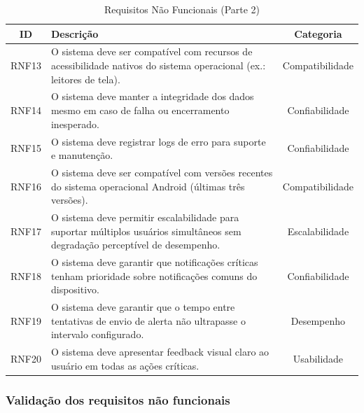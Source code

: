 \begin{table}[H]
\caption{Requisitos Não Funcionais (Parte 2)}
\label{quad_rnf2}
\centering

\begin{tabular}{|c|p{8cm}|c|}
\hline
\textbf{ID} & \textbf{Descrição} & \textbf{Categoria} \\
\hline

RNF13 &
O sistema deve ser compatível com recursos de acessibilidade nativos do sistema operacional (ex.: leitores de tela). &
Compatibilidade \\
\hline

RNF14 &
O sistema deve manter a integridade dos dados mesmo em caso de falha ou encerramento inesperado. &
Confiabilidade \\
\hline

RNF15 &
O sistema deve registrar logs de erro para suporte e manutenção. &
Confiabilidade \\
\hline

RNF16 &
O sistema deve ser compatível com versões recentes do sistema operacional Android (últimas três versões). &
Compatibilidade \\
\hline

RNF17 &
O sistema deve permitir escalabilidade para suportar múltiplos usuários simultâneos sem degradação perceptível de desempenho. &
Escalabilidade \\
\hline

RNF18 &
O sistema deve garantir que notificações críticas tenham prioridade sobre notificações comuns do dispositivo. &
Confiabilidade \\
\hline

RNF19 &
O sistema deve garantir que o tempo entre tentativas de envio de alerta não ultrapasse o intervalo configurado. &
Desempenho \\
\hline

RNF20 &
O sistema deve apresentar feedback visual claro ao usuário em todas as ações críticas. &
Usabilidade \\
\hline

\end{tabular}

\end{table}


\subsubsection{Validação dos requisitos não funcionais}


